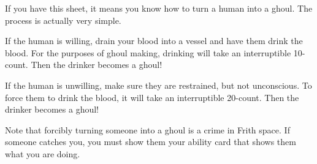\documentclass[green]{guildcamp4}
\begin{document}
\name{\gMakeGhoul{}}

If you have this sheet, it means you know how to turn a human into a ghoul. The process is actually very simple. 

If the human is willing, drain your blood into a vessel and have them drink the blood. For the purposes of ghoul making, drinking will take an interruptible 10-count. Then the drinker becomes a ghoul!

If the human is unwilling, make sure they are restrained, but not unconscious. To force them to drink the blood, it will take an interruptible 20-count. Then the drinker becomes a ghoul!

Note that forcibly turning someone into a ghoul is a crime in Frith space. If someone catches you, you must show them your ability card that shows them what you are doing.
\end{document}
